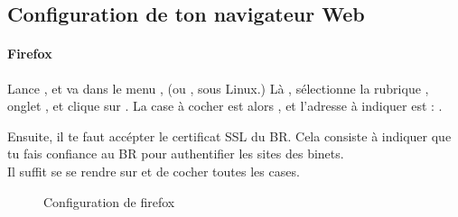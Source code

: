 
\subsection{Configuration de ton navigateur Web}
\label{browser}

\paragraph{Firefox}

Lance , et va dans le menu ,
 (ou ,  sous Linux.) L\`a , s\'electionne la rubrique , onglet , et clique sur
. La case \`a  cocher est alors ,
et l'adresse \`a  indiquer est : .

Ensuite, il te faut acc\'epter le certificat SSL du BR. Cela consiste \`a indiquer que tu fais confiance au BR pour authentifier les sites des binets.\\
Il suffit se se rendre sur  et de cocher toutes les cases.\\

\noindent
  \begin{figure}[!h]
    \begin{center}  
           \caption{Configuration de firefox}
    \end{center}
  \end{figure}
%

